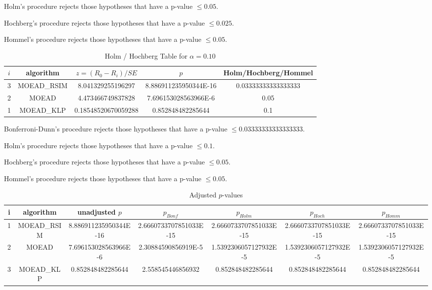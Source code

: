 \documentclass[a4paper,10pt]{article}
\begin{document}
\begin{landscape}
Holm's procedure rejects those hypotheses that have a p-value $\le0.05$.


Hochberg's procedure rejects those hypotheses that have a p-value $\le0.025$.


Hommel's procedure rejects those hypotheses that have a p-value $\le0.05$.


\begin{table}[!htp]
\centering\tiny
\caption{Holm / Hochberg Table for $\alpha=0.10$}
\begin{tabular}{ccccc}
$i$&algorithm&$z=(R_0 - R_i)/SE$&$p$&Holm/Hochberg/Hommel\\
\hline
3&MOEAD_RSIM&8.041329255196297&8.886911235950344E-16&0.03333333333333333\\
2&MOEAD&4.473466749837828&7.696153028563966E-6&0.05\\
1&MOEAD_KLP&0.18548520670059288&0.852848482285644&0.1\\
\hline
\end{tabular}
\end{table}
Bonferroni-Dunn's procedure rejects those hypotheses that have a p-value $\le0.03333333333333333$.


Holm's procedure rejects those hypotheses that have a p-value $\le0.1$.


Hochberg's procedure rejects those hypotheses that have a p-value $\le0.05$.


Hommel's procedure rejects those hypotheses that have a p-value $\le0.05$.


\begin{table}[!htp]
\centering\tiny
\caption{Adjusted $p$-values}
\begin{tabular}{ccccccc}
i&algorithm&unadjusted $p$&$p_{Bonf}$&$p_{Holm}$&$p_{Hoch}$&$p_{Homm}$\\
\hline
1&MOEAD_RSIM&8.886911235950344E-16&2.6660733707851033E-15&2.6660733707851033E-15&2.6660733707851033E-15&2.6660733707851033E-15\\
2&MOEAD&7.696153028563966E-6&2.30884590856919E-5&1.5392306057127932E-5&1.5392306057127932E-5&1.5392306057127932E-5\\
3&MOEAD_KLP&0.852848482285644&2.558545446856932&0.852848482285644&0.852848482285644&0.852848482285644\\
\hline
\end{tabular}
\end{table}


\end{landscape}
\end{document}

